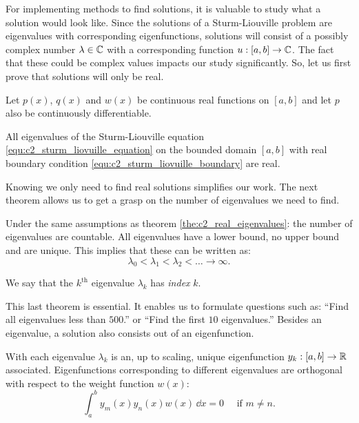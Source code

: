 For implementing methods to find solutions, it is valuable to study what a solution would look like. Since the solutions of a Sturm-Liouville problem are eigenvalues with corresponding eigenfunctions, solutions will consist of a possibly complex number $\lambda \in \mathbb{C}$ with a corresponding function $u : [a, b] \to \mathbb{C}$. The fact that these could be complex values impacts our study significantly. So, let us first prove that solutions will only be real.

\begin{theorem}\label{the:c2_real_eigenvalues}
    Let $p(x)$, $q(x)$ and $w(x)$ be continuous real functions on $[a, b]$ and let $p$ also be continuously differentiable.

    All eigenvalues of the Sturm-Liouville equation \eqref{equ:c2_sturm_liovuille_equation} on the bounded domain $[a, b]$ with real boundary condition \eqref{equ:c2_sturm_liovuille_boundary} are real.
\end{theorem}

Knowing we only need to find real solutions simplifies our work. The next theorem allows us to get a grasp on the number of eigenvalues we need to find.

\begin{theorem}\label{the:c2_slp_countable}
    Under the same assumptions as theorem \ref{the:c2_real_eigenvalues}: the number of eigenvalues are countable. All eigenvalues have a lower bound, no upper bound and are unique. This implies that these can be written as:
    $$
        \lambda_0 < \lambda_1 < \lambda_2 < \dots \to \infty \text{.}
    $$

    We say that the $k^{\text{th}}$ eigenvalue $\lambda_k$ has \emph{index} $k$.
\end{theorem}

This last theorem is essential. It enables us to formulate questions such as: ``Find all eigenvalues less than $500$.'' or ``Find the first $10$ eigenvalues.'' Besides an eigenvalue, a solution also consists out of an eigenfunction.

\begin{theorem}
    With each eigenvalue $\lambda_k$ is an, up to scaling, unique eigenfunction $y_k : [a, b] \to \mathbb{R}$ associated. Eigenfunctions corresponding to different eigenvalues are orthogonal with respect to the weight function $w(x)$:
    $$
        \int_a^b y_m(x) y_n(x) w(x) \, \dd x = 0 \quad \text{ if $m \neq n$.}
    $$
\end{theorem}

